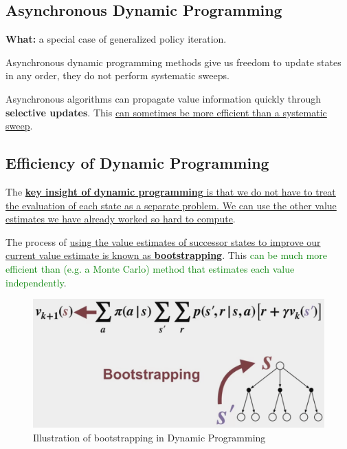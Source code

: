 \documentclass[12pt, a4paper]{article}
\begin{document}
\subsection{Asynchronous Dynamic Programming}\label{asynchronous-dynamic-programming}

\textbf{What:} a special case of generalized policy iteration.

Asynchronous dynamic programming methods give us freedom to update states in any order, they do not perform systematic sweeps.

Asynchronous algorithms can propagate value information quickly through \textbf{selective updates}. This \uline{can sometimes be more efficient than a systematic sweep}.



\subsection{Efficiency of Dynamic Programming}\label{efficiency-of-dynamic-programming}

The \uline{\textbf{key insight of dynamic programming} is that we do not have to treat the evaluation of each state as a separate problem. We can use the other value estimates we have already worked so hard to compute}.

The process of \uline{using the value estimates of successor states to improve our current value estimate is known as \textbf{bootstrapping}}. This \textcolor{Green}{can be much more efficient than (e.g. a Monte Carlo) method that estimates each value independently}.

\begin{figure}[H]
  \centering  %
    \includegraphics[width=0.8\columnwidth]{images/bootstrapping.png}
    \caption{Illustration of bootstrapping in Dynamic Programming}
    \label{fig:bootstrapping}
\end{figure}
\end{document}
